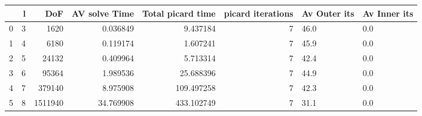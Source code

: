 \begin{tabular}{lrrrrrll}
\toprule
{} &  l &      DoF &  AV solve Time &  Total picard time &  picard iterations & Av Outer its & Av Inner its \\
\midrule
0 &  3 &     1620 &       0.036849 &           9.437184 &                  7 &         46.0 &          0.0 \\
1 &  4 &     6180 &       0.119174 &           1.607241 &                  7 &         45.9 &          0.0 \\
2 &  5 &    24132 &       0.409964 &           5.713314 &                  7 &         42.4 &          0.0 \\
3 &  6 &    95364 &       1.989536 &          25.688396 &                  7 &         44.9 &          0.0 \\
4 &  7 &   379140 &       8.975908 &         109.497258 &                  7 &         42.3 &          0.0 \\
5 &  8 &  1511940 &      34.769908 &         433.102749 &                  7 &         31.1 &          0.0 \\
\bottomrule
\end{tabular}
